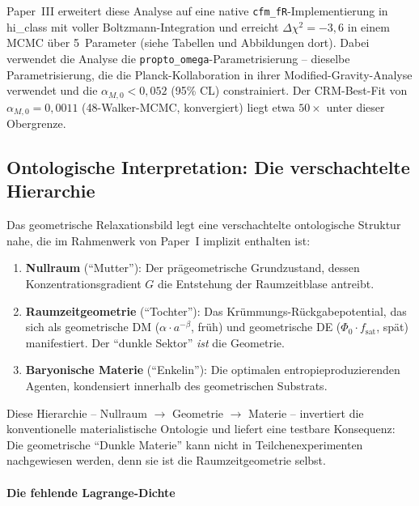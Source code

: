 \documentclass[aps,prd,twocolumn,superscriptaddress,nofootinbib]{revtex4-2}
\begin{document}
Paper~III \cite{Geiger2026c} erweitert diese Analyse auf eine native \texttt{cfm\_fR}-Implementierung in hi\_class mit voller Boltzmann-Integration und erreicht $\Delta\chi^2 = -3{,}6$ in einem MCMC \"uber 5~Parameter (siehe Tabellen und Abbildungen dort). Dabei verwendet die Analyse die \texttt{propto\_omega}-Parametrisierung -- dieselbe Parametrisierung, die die Planck-Kollaboration in ihrer Modified-Gravity-Analyse verwendet \cite{PlanckMG2016} und die $\alpha_{M,0} < 0{,}052$ (95\% CL) constrainiert. Der CRM-Best-Fit von $\alpha_{M,0} = 0{,}0011$ (48-Walker-MCMC, konvergiert) liegt etwa $50\times$ unter dieser Obergrenze.

\subsection{Ontologische Interpretation: Die verschachtelte Hierarchie}
\label{subsec:nested}

Das geometrische Relaxationsbild legt eine verschachtelte ontologische Struktur nahe, die im Rahmenwerk von Paper~I \cite{Geiger2026} implizit enthalten ist:

\begin{enumerate}
\item \textbf{Nullraum} ("`Mutter"'): Der pr\"ageometrische Grundzustand, dessen Konzentrationsgradient $G$ die Entstehung der Raumzeitblase antreibt.
\item \textbf{Raumzeitgeometrie} ("`Tochter"'): Das Kr\"ummungs-R\"uckgabepotential, das sich als geometrische DM ($\alpha \cdot a^{-\beta}$, fr\"uh) und geometrische DE ($\Phi_0 \cdot f_{\mathrm{sat}}$, sp\"at) manifestiert. Der "`dunkle Sektor"' \textit{ist} die Geometrie.
\item \textbf{Baryonische Materie} ("`Enkelin"'): Die optimalen entropieproduzierenden Agenten, kondensiert innerhalb des geometrischen Substrats.
\end{enumerate}

Diese Hierarchie -- Nullraum $\to$ Geometrie $\to$ Materie -- invertiert die konventionelle materialistische Ontologie und liefert eine testbare Konsequenz: Die geometrische "`Dunkle Materie"' kann nicht in Teilchenexperimenten nachgewiesen werden, denn sie ist die Raumzeitgeometrie selbst.

\paragraph{Die fehlende Lagrange-Dichte}
\end{document}
